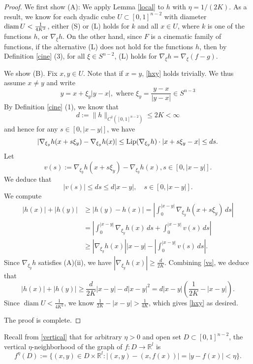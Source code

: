 \documentclass[11pt,a4paper,reqno]{amsart}
\newcommand{\R}{\mathbb{R}}
\newcommand{\1}{\mathbf{1}}
\newcommand{\diam}{\operatorname{diam}}
\numberwithin{equation}{section}
\theoremstyle{plain}
\theoremstyle{definition}
\theoremstyle{remark}
\begin{document}
\begin{proof}
We first show (A):
   We apply Lemma \ref{local} to $h$ with $\eta = 1/(2K)$. As a result, we know for each dyadic cube $U \subset [0,1]^{n-2}$ with diameter ${\rm diam \, } U < \frac{1}{4K^2} $,
 either (S) or (L) holds for $k$ and all $x \in U$, where $k$ is one of the
functions $h$, or $\nabla_\xi h$. On the other hand,
since $F$ is a cinematic family of functions, if the alternative (L) does not hold for the functions $h$, then by Definition \ref{cine} (3), for all $\xi \in S^{n-2}$, (L) holds for $\nabla_\xi h=\nabla_\xi (f-g)$.

We show (B). Fix $x,y \in U$. Note that if $x=y$, \eqref{hxy} holds trivially. We thus assume
$x \ne y$ and write
 $$ y = x+ \xi_y |y-x|, \mbox{ where } \xi_y = \frac{y-x}{|y-x|} \in S^{n-3}$$
 By Definition \ref{cine} (1), we know that
$$d:=\|h\|_{C^2([0,1]^{n-2})} \le 2K < \infty$$
 and hence for any $s \in [0,|x-y|]$, we have
$$  |\nabla_{\xi_y}h(x+s\xi_y) - \nabla_{\xi_y}h(x)| \le {\rm Lip}(\nabla_{\xi_y} h)\cdot |x+s\xi_y-x| \le  ds.   $$
Let
$$ v(s):=\nabla_{\xi_y}h(x+s\xi_y) - \nabla_{\xi_y}h(x), s \in [0,|x-y|]. $$
We deduce that
\begin{equation}\label{vs}
 |v(s)| \le ds \le d|x-y|, \quad s \in [0,|x-y|].
\end{equation}
We compute
\begin{align*}
  |h(x)|+| h(y)|  & \ge |h(y)-h(x)| = |\int_0^{|x-y|}\nabla_{\xi_y}h(x+s\xi_y) \, ds | \\
   & =|\int_0^{|x-y|}\nabla_{\xi_y}h(x) \, ds + \int_0^{|x-y|}v(s) \, ds |  \\
   &\ge |\nabla_{\xi_y}h(x)||x-y| - |\int_0^{|x-y|}v(s) \, ds | .
\end{align*}
Since $\nabla_{\xi_y}h$ satisfies (A)(ii), we have $|\nabla_{\xi_y}h(x)| \ge \frac{d}{2K}$. Combining \eqref{vs}, we deduce that
$$ |h(x)|+| h(y)| \ge \frac{d}{2K}|x-y| - d|x-y|^2 = d|x-y|(\frac{1}{2K} - |x-y|).  $$
Since $\diam U < \frac{1}{4K^2}$, we know $\frac{1}{2K} - |x-y| > \frac{1}{4K}$, which gives \eqref{hxy} as desired.

  The proof is complete.
\end{proof}

Recall from \eqref{vertical} that for arbitrary $\eta>0$ and
open set $D \subset [0,1]^{n-2}$, the vertical $\eta$-neighborhood of the graph of $f:D \to \R^l$ is
   $$f^{\eta}(D):= \{(x,y) \in D \times \R^{l} : |(x,y)-(x,f(x))|= |y-f(x)|< \eta \}.$$
\end{document}

